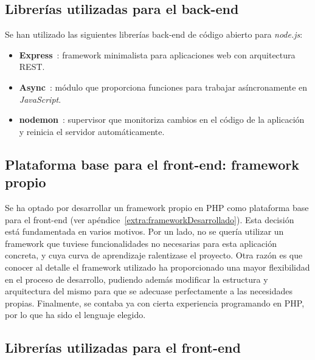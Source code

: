 \subsection*{Librerías utilizadas para el \gls{back-end}\label{ssec:dp:back-end-libs}}

Se han utilizado las siguientes librerías \gls{back-end} de código abierto para \textit{node.js}:

\begin{itemize}
  \item \textbf{Express}~\cite{express}: \gls{framework} minimalista para aplicaciones web con arquitectura \gls{REST}.

  \item \textbf{Async}~\cite{async}: módulo que proporciona funciones para trabajar asíncronamente en \textit{JavaScript}.

  \item \textbf{nodemon}~\cite{nodemon}: supervisor que monitoriza cambios en el código de la aplicación y reinicia el servidor automáticamente.

\end{itemize}

\subsection*{Plataforma base para el \gls{front-end}: \gls{framework} propio\label{ssec:dp:front-end}}

Se ha optado por desarrollar un \gls{framework} propio en \gls{PHP} como plataforma base para el \gls{front-end} (ver apéndice~\ref{extra:frameworkDesarrollado}).
Esta decisión está fundamentada en varios motivos.
Por un lado, no se quería utilizar un \gls{framework} que tuviese funcionalidades no necesarias para esta aplicación concreta, y cuya curva de aprendizaje ralentizase el proyecto.
Otra razón es que conocer al detalle el \gls{framework} utilizado ha proporcionado una mayor flexibilidad en el proceso de desarrollo, pudiendo además modificar la estructura y arquitectura del mismo para que se adecuase perfectamente a las necesidades propias.
Finalmente, se contaba ya con cierta experiencia programando en \gls{PHP}, por lo que ha sido el lenguaje elegido.

\subsection*{Librerías utilizadas para el \gls{front-end}\label{ssec:dp:front-end-libs}}

